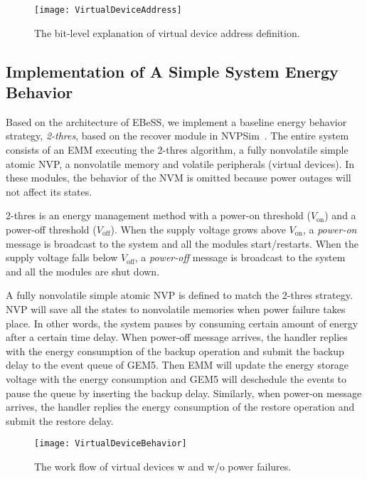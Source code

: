 \begin{figure}[!htpb]
	\centering
	\vspace{-5pt}
	\texttt{[image: VirtualDeviceAddress]}
	\vspace{-5pt}
	\caption{The bit-level explanation of virtual device address definition.}	\label{fig:VirtualDeviceAddress}
\end{figure}

\subsection{Implementation of A Simple System Energy Behavior}	\label{sec:tech-example}
% 
Based on the architecture of EBeSS, we implement a baseline energy behavior strategy, \emph{2-thres}, based on the recover module in NVPSim~\cite{gu2016nvpsim}. 
The entire system consists of an EMM executing the 2-thres algorithm, a fully nonvolatile simple atomic NVP, a nonvolatile memory and volatile peripherals (virtual devices).
In these modules, the behavior of the NVM is omitted because power outages will not affect its states.

%
2-thres is an energy management method with a power-on threshold ($V_\text{on}$) and a power-off threshold ($V_\text{off}$).
When the supply voltage grows above $V_\text{on}$, a \emph{power-on} message is broadcast to the system and all the modules start/restarts.
When the supply voltage falls below $V_\text{off}$, a \emph{power-off} message is broadcast to the system and all the modules are shut down.

%
A fully nonvolatile simple atomic NVP is defined to match the 2-thres strategy.
NVP will save all the states to nonvolatile memories when power failure takes place.
In other words, the system pauses by consuming certain amount of energy after a certain time delay.
When power-off message arrives, the handler replies with the energy consumption of the backup operation and submit the backup delay to the event queue of GEM5.
Then EMM will update the energy storage voltage with the energy consumption and GEM5 will deschedule the events to pause the queue by inserting the backup delay.
Similarly, when power-on message arrives, the handler replies  the energy consumption of the restore operation and submit the restore delay.

\begin{figure}[!htpb]
	\centering
	\vspace{-5pt}
	\texttt{[image: VirtualDeviceBehavior]}
	\vspace{-15pt}
	\caption{The work flow of virtual devices w and w/o power failures.}	\label{fig:VirtualDeviceBehavior}
\end{figure}

